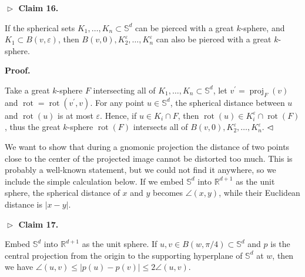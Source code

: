 \par
\par
\par\medskip\noindent\textbf{$\vartriangleright$ Claim 16.}\par
If the spherical sets $K_{1},\ldots,K_{n}\subset\mathbb{S}^{d}$ can be pierced with a great $k$-sphere, and $K_{1}\subset B(v,\varepsilon)$, then $B(v,0),K_{2}^{\varepsilon},\ldots,K_{n}^{\varepsilon}$ can also be pierced with a great $k$-sphere.
\par
\par
\par
\par
\par\medskip\noindent\textbf{Proof.}\par
Take a great $k$-sphere $F$ intersecting all of $K_{1},\ldots,K_{n}\subset\mathbb{S}^{d}$, let $v^{\prime}=\operatorname{proj}_{F}(v)$ and $\operatorname{rot}=\operatorname{rot}(v^{\prime},v)$. For any point $u\in\mathbb{S}^{d}$, the spherical distance between $u$ and $\operatorname{rot}(u)$ is at most $\varepsilon$. Hence, if $u\in K_{i}\cap F$, then $\operatorname{rot}(u)\in K_{i}^{\varepsilon}\cap\operatorname{rot}(F)$, thus the great $k$-sphere $\operatorname{rot}(F)$ intersects all of $B(v,0),K_{2}^{\varepsilon},\ldots,K_{n}^{\varepsilon}$. $\hfill\vartriangleleft$
\par
\par
We want to show that during a gnomonic projection the distance of two points close to the center of the projected image cannot be distorted too much. This is probably a well-known statement, but we could not find it anywhere, so we include the simple calculation below. If we embed $\mathbb{S}^{d}$ into $\mathbb{R}^{d+1}$ as the unit sphere, the spherical distance of $x$ and $y$ becomes $\angle(x,y)$, while their Euclidean distance is $|x-y|$.
\par
\par
\par\medskip\noindent\textbf{$\vartriangleright$ Claim 17.}\par
Embed $\mathbb{S}^{d}$ into $\mathbb{R}^{d+1}$ as the unit sphere. If $u,v\in B(w,\pi/4)\subset\mathbb{S}^{d}$ and $p$ is the central projection from the origin to the supporting hyperplane of $\mathbb{S}^{d}$ at $w$, then we have $\angle(u,v)\leq|p(u)-p(v)|\leq 2\angle(u,v)$.
\par
\par
\par
\par
